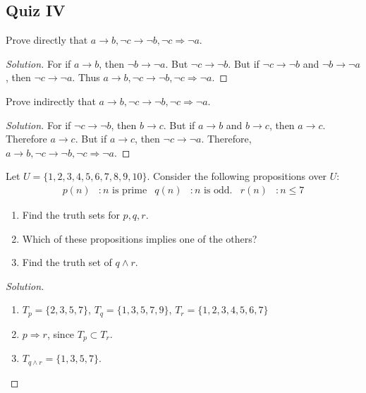     \subsection{Quiz IV}
    \begin{problem}
    Prove directly that $a\rightarrow b, \neg c\rightarrow \neg b, \neg c \Rightarrow \neg a$.
    \end{problem}
    \begin{proof}[Solution]
    \vspace{-0.5\topsep}
    For if $a\rightarrow b$, then $\neg b \rightarrow \neg a$. But $\neg c \rightarrow \neg b$. But if $\neg c \rightarrow \neg b$ and $\neg b \rightarrow \neg a$, then $\neg c \rightarrow \neg a$. Thus $a\rightarrow b, \neg c \rightarrow \neg b, \neg c \Rightarrow \neg a$.
    \end{proof}
    \begin{problem}
    Prove indirectly that $a\rightarrow b, \neg c \rightarrow \neg b, \neg c \Rightarrow \neg a$.
    \end{problem}
    \begin{proof}[Solution]
    \vspace{-0.5\topsep}
    For if $\neg c \rightarrow \neg b$, then $b\rightarrow c$. But if $a\rightarrow b$ and $b\rightarrow c$, then $a\rightarrow c$. Therefore $a\rightarrow c$. But if $a\rightarrow c$, then $\neg c \rightarrow \neg a$. Therefore, $a\rightarrow b, \neg c \rightarrow \neg b, \neg c \Rightarrow \neg a$.
    \end{proof}
    \begin{problem}
    Let $U = \{1,2,3,4,5,6,7,8,9,10\}$. Consider the following propositions over $U$:
    \begin{align*}
        p(n)&:n\textrm{ is prime} & q(n)&:n\textrm{ is odd.} & r(n)&:n\leq 7
    \end{align*}
    \begin{enumerate}
        \item Find the truth sets for $p,q,r$.
        \item Which of these propositions implies one of the others?
        \item Find the truth set of $q\land r$.
    \end{enumerate}
    \end{problem}
    \begin{proof}[Solution]
    \vspace{-\topsep}
    \
    \begin{enumerate}
        \item $T_{p} = \{2,3,5,7\}$, $T_{q} = \{1,3,5,7,9\}$, $T_{r} = \{1,2,3,4,5,6,7\}$
        \item $p\Rightarrow r$, since $T_{p}\subset T_{r}$.
        \item $T_{q\land r} = \{1,3,5,7\}$.
    \end{enumerate}
    \end{proof}